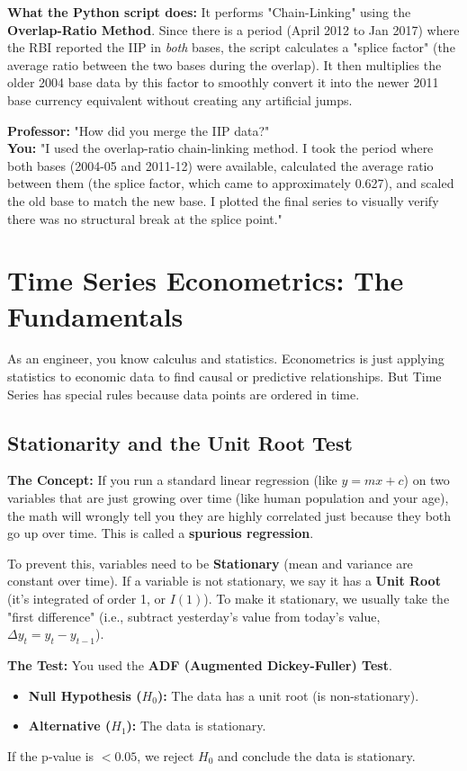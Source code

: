\documentclass[12pt,a4paper]{report}
\begin{document}
\textbf{What the Python script does:}
It performs "Chain-Linking" using the \textbf{Overlap-Ratio Method}. Since there is a period (April 2012 to Jan 2017) where the RBI reported the IIP in \textit{both} bases, the script calculates a "splice factor" (the average ratio between the two bases during the overlap). It then multiplies the older 2004 base data by this factor to smoothly convert it into the newer 2011 base currency equivalent without creating any artificial jumps.

\textbf{Professor:} "How did you merge the IIP data?"\\
\textbf{You:} "I used the overlap-ratio chain-linking method. I took the period where both bases (2004-05 and 2011-12) were available, calculated the average ratio between them (the splice factor, which came to approximately 0.627), and scaled the old base to match the new base. I plotted the final series to visually verify there was no structural break at the splice point."

\newpage
\chapter{Time Series Econometrics: The Fundamentals}
As an engineer, you know calculus and statistics. Econometrics is just applying statistics to economic data to find causal or predictive relationships. But Time Series has special rules because data points are ordered in time.

\section{Stationarity and the Unit Root Test}
\textbf{The Concept:} If you run a standard linear regression (like $y = mx + c$) on two variables that are just growing over time (like human population and your age), the math will wrongly tell you they are highly correlated just because they both go up over time. This is called a \textbf{spurious regression}.

To prevent this, variables need to be \textbf{Stationary} (mean and variance are constant over time). If a variable is not stationary, we say it has a \textbf{Unit Root} (it's integrated of order 1, or $I(1)$). To make it stationary, we usually take the "first difference" (i.e., subtract yesterday's value from today's value, $\Delta y_t = y_t - y_{t-1}$).

\textbf{The Test:} You used the \textbf{ADF (Augmented Dickey-Fuller) Test}.
\begin{itemize}
    \item \textbf{Null Hypothesis ($H_0$):} The data has a unit root (is non-stationary).
    \item \textbf{Alternative ($H_1$):} The data is stationary.
\end{itemize}
If the p-value is $< 0.05$, we reject $H_0$ and conclude the data is stationary. 
\end{document}
